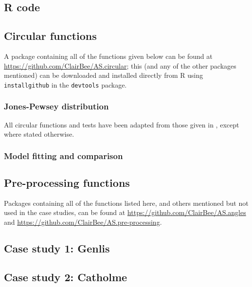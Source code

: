 \documentclass[12pt,fleqn]{article}
\numberwithin{equation}{section}
\numberwithin{figure}{section}
\numberwithin{table}{section}
\begin{document}
\begin{appendix}
\section{R code}
\label{app:R-code}
\subsection{Circular functions}
A package containing all of the functions given below can be found at \url{https://github.com/ClairBee/AS.circular}; this (and any of the other packages mentioned) can be downloaded and installed directly from R using \texttt{install\textunderscore github} in the \texttt{devtools} package.

\subsubsection{Jones-Pewsey distribution}
All circular functions and tests have been adapted from those given in \cite{Pewsey2014}, except where stated otherwise. 


\subsubsection{Model fitting and comparison}


\subsection{Pre-processing functions}
Packages containing all of the functions listed here, and others mentioned but not used in the case studies, can be found at \url{https://github.com/ClairBee/AS.angles} and \url{https://github.com/ClairBee/AS.pre-processing}.


\subsection{Case study 1: Genlis}
\label{app:CS1}


\subsection{Case study 2: Catholme}
\label{app:CS2}


\end{appendix}

\newpage
\printbibliography
\end{document}
